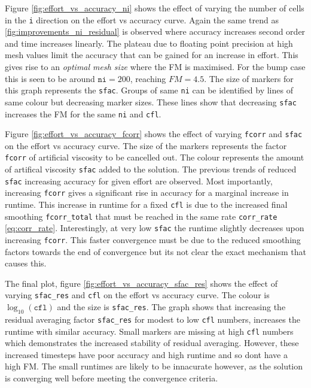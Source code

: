 \documentclass{article}
\begin{document}
Figure \ref{fig:effort_vs_accuracy_ni} shows the effect of varying the number of cells in the \texttt{i} direction on the effort vs accuracy curve.
Again the same trend as \ref{fig:improvements_ni_residual} is observed where accuracy increases second order and time increases linearly.
The plateau due to floating point precision at high mesh values limit the accuracy that can be gained for an increase in effort.
This gives rise to an \textit{optimal mesh size} where the FM is maximised.
For the bump case this is seen to be around $\texttt{ni}=200$, reaching $FM =4.5$.
The size of markers for this graph represents the \texttt{sfac}.
Groups of same \texttt{ni} can be identified by lines of same colour but decreasing marker sizes.
These lines show that decreasing \texttt{sfac} increases the FM for the same \texttt{ni} and \texttt{cfl}.

Figure \ref{fig:effort_vs_accuracy_fcorr} shows the effect of varying \texttt{fcorr} and \texttt{sfac} on the effort vs accuracy curve.
The size of the markers represents the factor \texttt{fcorr} of artificial viscosity to be cancelled out.
The colour represents the amount of artifical viscosity \texttt{sfac} added to the solution.
The previous trends of reduced \texttt{sfac} increasing accuracy for given effort are observed.
Most importantly, increasing \texttt{fcorr} gives a significant rise in accuracy for a marginal increase in runtime.
This increase in runtime for a fixed \texttt{cfl} is due to the increased final smoothing \texttt{fcorr\_total} that must be reached in the same rate \texttt{corr\_rate} \ref{eq:corr_rate}.
Interestingly, at very low \texttt{sfac} the runtime slightly decreases upon increasing \texttt{fcorr}.
This faster convergence must be due to the reduced smoothing factors towards the end of convergence but its not clear the exact mechanism that causes this.

The final plot, figure \ref{fig:effort_vs_accuracy_sfac_res} shows the effect of varying \texttt{sfac\_res} and \texttt{cfl} on the effort vs accuracy curve.
The colour is $\log_{10}(\texttt{cfl})$ and the size is \texttt{sfac\_res}.
The graph shows that increasing the residual averaging factor \texttt{sfac\_res} for modest to low \texttt{cfl} numbers, increases the runtime with similar accuracy.
Small markers are missing at high \texttt{cfl} numbers which demonstrates the increased stability of residual averaging.
However, these increased timesteps have poor accuracy and high runtime and so dont have a high FM.
The small runtimes are likely to be innacurate however, as the solution is converging well before meeting the convergence criteria.
\end{document}
